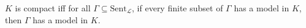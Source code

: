 $K$ is compact iff for all $\Gamma \subseteq \text{Sent}_{\mathcal{L}}$, if every finite subset of $\Gamma$ has a model in $K$, then $\Gamma$ has a model in $K$.

